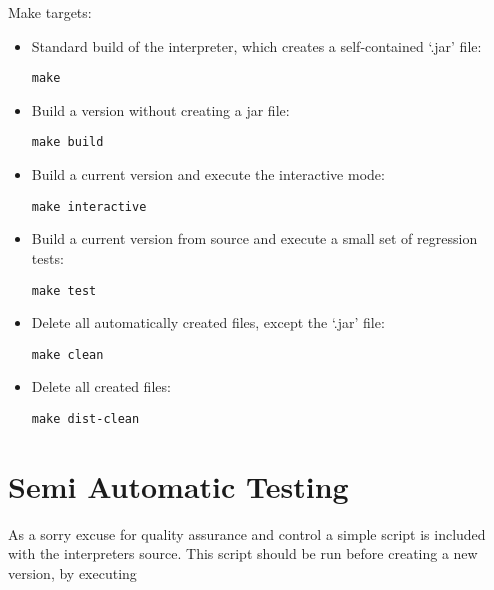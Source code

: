 Make targets:

\begin{itemize}
	\item Standard build of the interpreter, which creates a self-contained `.jar' file:
\begin{lstlisting}[frame=none,numbers=none]
make
\end{lstlisting}

	\item Build a version without creating a jar file:

\begin{lstlisting}[frame=none,numbers=none]
make build
\end{lstlisting}

	\item Build a current version and execute the interactive mode:

\begin{lstlisting}[frame=none,numbers=none]
make interactive
\end{lstlisting}

	\item Build a current version from source and execute a small set of regression tests:

\begin{lstlisting}[frame=none,numbers=none]
make test
\end{lstlisting}

	\item Delete all automatically created files, except the `.jar' file:

\begin{lstlisting}[frame=none,numbers=none]
make clean
\end{lstlisting}

	\item Delete all created files:

\begin{lstlisting}[frame=none,numbers=none]
make dist-clean
\end{lstlisting}

\end{itemize}

\section{Semi Automatic Testing}\label{testing}

As a sorry excuse for quality assurance and control a simple  script is included with the interpreters source.
This script should be run before creating a new version, by executing

